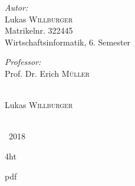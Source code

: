 \documentclass[
  fontsize=12pt, %
  a4paper,  %
  oneside,  %
  bibliography=totoc,
  headsepline,
  cleardoublepage=empty,
  parskip=half,
  draft=false
]{scrbook}
\begin{document}
\begin{titlepage}

\begin{minipage}{0.4\textwidth}

\emph{Autor:}\\
Lukas \textsc{Willburger}\\ %
Matrikelnr. 322445 \\
Wirtschaftsinformatik, 6. Semester \\ \newline 


\emph{Professor: }\\
Prof. Dr. Erich \textsc{Müller} \\ \newline  \newline

\hrulefill \\
\centering Lukas \textsc{Willburger}
\end{minipage}\\[1cm]






{\textcopyright\ 2018}\\[2cm] %

\vfill %

\end{titlepage}

\iftex4ht
  \Configure{$}{\PicMath}{\EndPicMath}{}

  {pdf}
  {%
  }
\fi
\end{document}
